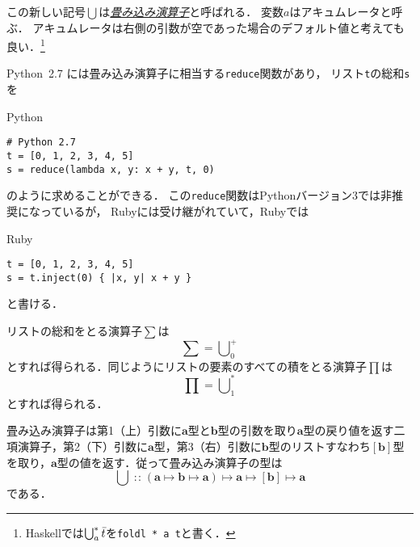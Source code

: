\documentclass[a5paper,draft]{jsbook}
\newcommand{\programminglanguage}[1]{\textsf{#1}}
\newcommand{\haskell}{\programminglanguage{Haskell}}
\newcommand{\python}{\programminglanguage{Python}}
\newcommand{\keyword}[1]{{\underline{\emph{#1}}}}
\newcommand{\code}[1]{\texttt{#1}}
\newenvironment{pythoncode}{\begin{itembox}[r]{\python}}{\end{itembox}}
\newenvironment{rubycode}{\begin{itembox}[r]{Ruby}}{\end{itembox}}
\newcommand{\pthnId}[1]{{DO NOT USE}--\textit{#1}}
\newcommand{\pthnKeyword}[1]{{DO NOT USE}--\textbf{#1}}
\newcommand{\pthnOp}[1]{{DO NOT USE}--\texttt{#1}}
\newcommand{\mathTypeParameter}[1]{\mathbf{#1}}
\newcommand{\mathListType}[1]{\left[#1\right]}
\newcommand{\mathListVar}[1]{\Bar{#1}}
\DeclareMathOperator*{\mathFold}{\bigcup}
\newcommand{\mathBinaryOperator}[1]{\operatorname{#1}}
\newcommand{\mathIn}{\mathBinaryOperator{:\!:}}
\newcommand{\mathMapsTo}{\mapsto}
\newcommand{\mathMorphII}[3]{#1\mathMapsTo#2\mathMapsTo#3}
\newcommand{\mathMorphIII}[4]{#1\mathMapsTo#2\mathMapsTo#3\mathMapsTo#4}
\begin{document}
この新しい記号$\mathFold$は\keyword{畳み込み演算子}と呼ばれる．
変数$a$はアキュムレータと呼ぶ．
アキュムレータは右側の引数が空であった場合のデフォルト値と考えても良い．\footnote{\haskell では$\mathFold^{*}_{a}\mathListVar{t}$を\code{foldl * a t}と書く．}

\python\ 2.7 には畳み込み演算子に相当する\code{reduce}関数があり，
リスト\code{t}の総和\code{s}を
\begin{pythoncode}
\begin{verbatim}
# Python 2.7
t = [0, 1, 2, 3, 4, 5]
s = reduce(lambda x, y: x + y, t, 0)
\end{verbatim}
\end{pythoncode}
のように求めることができる．
この\code{reduce}関数は\python バージョン3では非推奨になっているが，
Rubyには受け継がれていて，Rubyでは
\begin{rubycode}
\begin{verbatim}
t = [0, 1, 2, 3, 4, 5]
s = t.inject(0) { |x, y| x + y }
\end{verbatim}
\end{rubycode}
と書ける．

リストの総和をとる演算子$\sum$は
\begin{equation}
\sum=\mathFold^+_0
\end{equation}
とすれば得られる．同じようにリストの要素のすべての積をとる演算子$\prod$は
\begin{equation}
\prod=\mathFold^*_1
\end{equation}
とすれば得られる．

畳み込み演算子は第1（上）引数に$\mathTypeParameter{a}$型と$\mathTypeParameter{b}$型の引数を取り$\mathTypeParameter{a}$型の戻り値を返す二項演算子，第2（下）引数に$\mathTypeParameter{a}$型，第3（右）引数に$\mathTypeParameter{b}$型のリストすなわち$\mathListType{\mathTypeParameter{b}}$型を取り，$\mathTypeParameter{a}$型の値を返す．従って畳み込み演算子の型は
\begin{equation}
\mathFold\mathIn\mathMorphIII{(\mathMorphII{\mathTypeParameter{a}}{\mathTypeParameter{b}}{\mathTypeParameter{a}})}{\mathTypeParameter{a}}{\mathListType{\mathTypeParameter{b}}}{\mathTypeParameter{a}}
\end{equation}
である．
\end{document}
